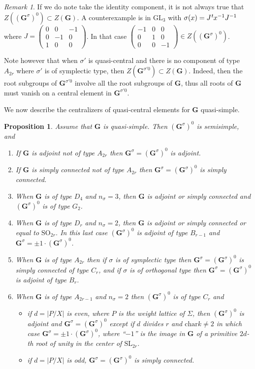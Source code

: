 \documentclass{amsart}
\newtheorem{proposition}[equation]{Proposition}
\numberwithin{equation}{section}
\theoremstyle{definition}
\theoremstyle{remark}
\newtheorem{remark}[equation]{Remark}
\newcommand\bG{{\mathbf G}}
\newcommand\Gs{{\bG^\sigma}}
\newcommand\Gso{{(\Gs)^0}}
\newcommand\lexp[2]{\kern\scriptspace\vphantom{#2}^{#1}\kern-\scriptspace#2}
\newcommand\inv{^{-1}}
\newcommand\GL{\mathrm{GL}}
\newcommand\SL{\mathrm{SL}}
\newcommand\SO{\mathrm{SO}}
\newcommand\car{\mathrm{char}}
\begin{document}
\begin{remark}
If we do note take the identity component,
it  is not always true that $Z(\Gso)\subset Z(\bG)$. A counterexample is in
$\GL_3$  with  $\sigma(x)=J\lexp  t  x\inv  J\inv$ where $J=\begin{pmatrix}
0&0&-1\\0&-1&0\\1&0&0\end{pmatrix}$.    In   that   case   $\begin{pmatrix}
-1&0&0\\0&1&0\\0&0&-1\end{pmatrix}\in Z(\Gso)$.

Note however that when $\sigma'$ is quasi-central and there is no component
of   type   $A_{2r}$   where   $\sigma'$   is   of  symplectic  type,  then
$Z(\bG^{\sigma'0})\subset   Z(\bG)$.   Indeed,   then   the  
root subgroups  of  $\bG^{\sigma'0}$  involve  all the
root subgroups of $\bG$, thus all roots of
$\bG$ must vanish on a central element in $\bG^{\sigma'0}$.
\end{remark}
We now describe the centralizers of quasi-central elements
for $\bG$ quasi-simple.
\begin{proposition}\label{type of Gso}
Assume that $\bG$ is quasi-simple. Then $\Gso$ is semisimple, and
\begin{enumerate}
\item  If $\bG$ is  adjoint not of type $A_{2r}$ then $\Gs=\Gso$ is adjoint.
\item  If $\bG$ is  simply connected not of type $A_{2r}$ then $\Gs=\Gso$ is
simply connected.
\item When $\bG$ is of type $D_4$ and $n_\sigma =3$, then $\bG$ is adjoint or 
simply connected and $\Gso$ is of type $G_2$.
\item When $\bG$ is of type $D_r$ and $n_\sigma =2$, then $\bG$ is adjoint or 
simply connected or equal to $\SO_{2r}$. In this last case $\Gso$ is adjoint
of type $B_{r-1}$ and $\Gs=\pm 1\cdot\Gso$.
\item When $\bG$ is of type $A_{2r}$ then if $\sigma$ is of symplectic type
then $\Gs=\Gso$ is simply connected of type $C_r$, 
and if $\sigma$ is of orthogonal type then $\Gs=\Gso$ is adjoint of type
$B_r$.
\item When $\bG$ is of type $A_{2r-1}$ and $n_\sigma=2$ then $\Gso$ is of type
$C_r$ and
\begin{itemize}
\item if $d=|P/X|$ is even, where $P$ is the weight lattice of $\Sigma$, then
$\Gso$ is adjoint and $\Gs=\Gso$ except if $d$ divides $r$ and $\car k\ne
2$ in which case $\Gs=\pm 1\cdot\Gso$, where ``$-1$'' is the image in
$\bG$ of a primitive $2d$-th root of unity in the center of $\SL_{2r}$.
\item if $d=|P/X|$ is odd, $\Gs=\Gso$ is simply connected.
\end{itemize}
\end{enumerate}
\end{proposition}
\end{document}
